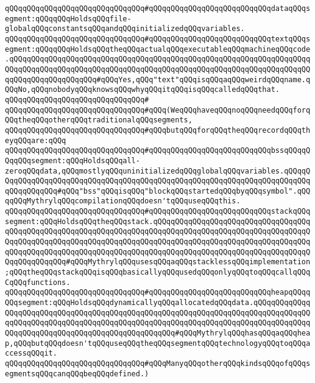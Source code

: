 \verb|qQQqqQQqqQQqqQQqqQQqqQQqqQQqqQQq#qQQqqQQqqQQqqQQqqQQqqQQqqQQqdataqQQqsegment:qQQqqQQqHoldsqQQqfile-globalqQQqconstantsqQQqandqQQqinitializedqQQqvariables.|\newline
\verb|qQQqqQQqqQQqqQQqqQQqqQQqqQQqqQQq#qQQqqQQqqQQqqQQqqQQqqQQqqQQqtextqQQqsegment:qQQqqQQqHoldsqQQqtheqQQqactualqQQqexecutableqQQqmachineqQQqcode.qQQqqQQqqQQqqQQqqQQqqQQqqQQqqQQqqQQqqQQqqQQqqQQqqQQqqQQqqQQqqQQqqQQqqQQqqQQqqQQqqQQqqQQqqQQqqQQqqQQqqQQqqQQqqQQqqQQqqQQqqQQqqQQqqQQqqQQqqQQqqQQqqQQqqQQqqQQqqQQq#qQQqYes,qQQq"text"qQQqisqQQqaqQQqweirdqQQqname.qQQqNo,qQQqnobodyqQQqknowsqQQqwhyqQQqitqQQqisqQQqcalledqQQqthat.|\newline
\verb|qQQqqQQqqQQqqQQqqQQqqQQqqQQqqQQq#|\newline
\verb|qQQqqQQqqQQqqQQqqQQqqQQqqQQqqQQq#qQQq(WeqQQqhaveqQQqnoqQQqneedqQQqforqQQqtheqQQqotherqQQqtraditionalqQQqsegments,|\newline
\verb|qQQqqQQqqQQqqQQqqQQqqQQqqQQqqQQq#qQQqbutqQQqforqQQqtheqQQqrecordqQQqtheyqQQqare:qQQq|\newline
\verb|qQQqqQQqqQQqqQQqqQQqqQQqqQQqqQQq#qQQqqQQqqQQqqQQqqQQqqQQqqQQqbssqQQqqQQqqQQqsegment:qQQqHoldsqQQqall-zeroqQQqdata,qQQqmostlyqQQquninitializedqQQqglobalqQQqvariables.qQQqqQQqqQQqqQQqqQQqqQQqqQQqqQQqqQQqqQQqqQQqqQQqqQQqqQQqqQQqqQQqqQQqqQQqqQQqqQQqqQQqqQQq#qQQq"bss"qQQqisqQQq"blockqQQqstartedqQQqbyqQQqsymbol".qQQqqQQqMythrylqQQqcompilationqQQqdoesn'tqQQquseqQQqthis.|\newline
\verb|qQQqqQQqqQQqqQQqqQQqqQQqqQQqqQQq#qQQqqQQqqQQqqQQqqQQqqQQqqQQqstackqQQqsegment:qQQqHoldsqQQqtheqQQqstack.qQQqqQQqqQQqqQQqqQQqqQQqqQQqqQQqqQQqqQQqqQQqqQQqqQQqqQQqqQQqqQQqqQQqqQQqqQQqqQQqqQQqqQQqqQQqqQQqqQQqqQQqqQQqqQQqqQQqqQQqqQQqqQQqqQQqqQQqqQQqqQQqqQQqqQQqqQQqqQQqqQQqqQQqqQQqqQQqqQQqqQQqqQQqqQQqqQQqqQQqqQQqqQQqqQQqqQQqqQQqqQQqqQQqqQQqqQQqqQQqqQQqqQQqqQQqqQQqqQQq#qQQqMythrylqQQqusesqQQqaqQQqstacklessqQQqimplementation;qQQqtheqQQqstackqQQqisqQQqbasicallyqQQqusedqQQqonlyqQQqtoqQQqcallqQQqCqQQqfunctions.|\newline
\verb|qQQqqQQqqQQqqQQqqQQqqQQqqQQqqQQq#qQQqqQQqqQQqqQQqqQQqqQQqqQQqheapqQQqqQQqsegment:qQQqHoldsqQQqdynamicallyqQQqallocatedqQQqdata.qQQqqQQqqQQqqQQqqQQqqQQqqQQqqQQqqQQqqQQqqQQqqQQqqQQqqQQqqQQqqQQqqQQqqQQqqQQqqQQqqQQqqQQqqQQqqQQqqQQqqQQqqQQqqQQqqQQqqQQqqQQqqQQqqQQqqQQqqQQqqQQqqQQqqQQqqQQqqQQqqQQqqQQqqQQqqQQqqQQqqQQqqQQqqQQq#qQQqMythrylqQQqhasqQQqaqQQqheap,qQQqbutqQQqdoesn'tqQQquseqQQqtheqQQqsegmentqQQqtechnologyqQQqtoqQQqaccessqQQqit.|\newline
\verb|qQQqqQQqqQQqqQQqqQQqqQQqqQQqqQQq#qQQqManyqQQqotherqQQqkindsqQQqofqQQqsegmentsqQQqcanqQQqbeqQQqdefined.)|\newline
